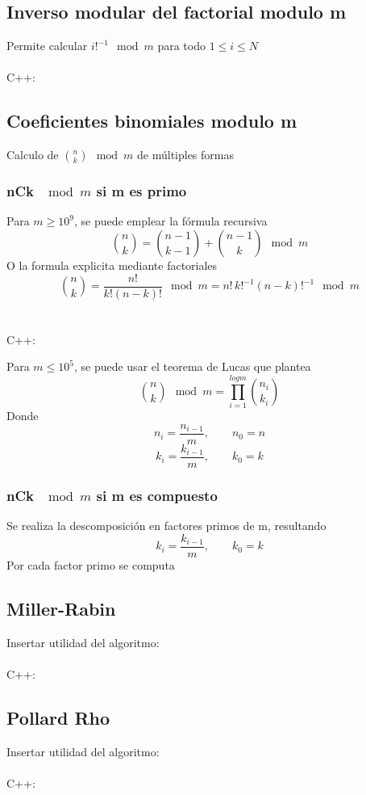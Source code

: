 \documentclass{article}
\begin{document}
    \subsection{Inverso modular del factorial modulo m}
        Permite calcular $ i!^{-1} \mod{m}$ para todo $1 \leq i \leq N$
        \\ \\
        C++:
        
    \subsection{Coeficientes binomiales modulo m}
        Calculo de $\binom{n}{k} \mod{m}$ de múltiples formas
        \subsubsection{nCk $\mod{m}$ si m es primo}
            Para $m \geq 10^9$, se puede emplear la fórmula recursiva
            \[
                \binom{n}{k} = \binom{n - 1}{k - 1} + \binom{n - 1}{k} \mod{m}
            \]
            O la formula explicita mediante factoriales
            \[
                \binom{n}{k} = \frac{n!}{k!(n-k)!}  \mod m = n!\, k!^{-1}(n - k)!^{-1} \mod{m}
            \]
            \\ \\
            C++:
            
            
            Para $ m \leq 10^5$, se puede usar el teorema de Lucas que plantea
            \[
                \binom{n}{k} \mod{m} = \prod_{i = 1}^{log{m}}\binom{n_i}{k_i}
            \]
            Donde
            \[
                n_i = \frac{n_{i - 1}}{m}, \qquad n_0 = n
            \]
            \[
                k_i = \frac{k_{i - 1}}{m}, \qquad k_0 = k
            \]
        \subsubsection{nCk $\mod{m}$ si m es compuesto}
            Se realiza la descomposición en factores primos de m, resultando
            \[
                k_i = \frac{k_{i - 1}}{m}, \qquad k_0 = k
            \]
            Por cada factor primo se computa 
    \subsection{Miller-Rabin}
        Insertar utilidad del algoritmo:
        \\ \\
        C++:
        
    \subsection{Pollard Rho}
        Insertar utilidad del algoritmo:
        \\ \\
        C++:
        
\pagebreak
\end{document}
